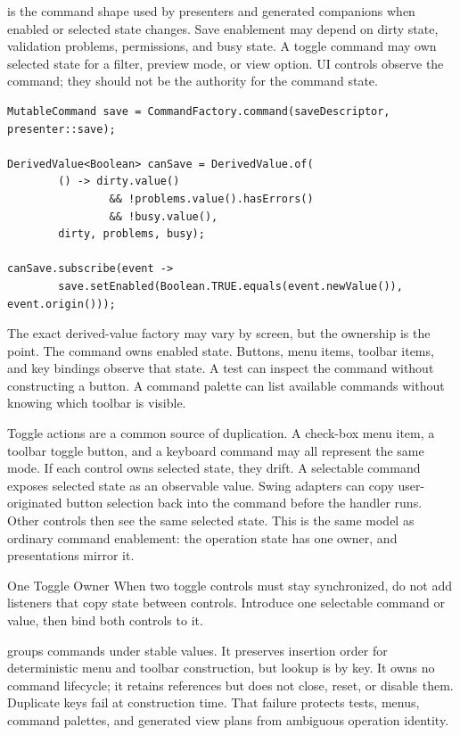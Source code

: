  is the command shape used by presenters and generated
companions when enabled or selected state changes. Save enablement may depend
on dirty state, validation problems, permissions, and busy state. A toggle
command may own selected state for a filter, preview mode, or view option. UI
controls observe the command; they should not be the authority for the command
state.

\begin{lstlisting}[caption={Enablement belongs to the command, not each button.}]
MutableCommand save = CommandFactory.command(saveDescriptor, presenter::save);

DerivedValue<Boolean> canSave = DerivedValue.of(
        () -> dirty.value()
                && !problems.value().hasErrors()
                && !busy.value(),
        dirty, problems, busy);

canSave.subscribe(event ->
        save.setEnabled(Boolean.TRUE.equals(event.newValue()), event.origin()));
\end{lstlisting}

The exact derived-value factory may vary by screen, but the ownership is the
point. The command owns enabled state. Buttons, menu items, toolbar items, and
key bindings observe that state. A test can inspect the command without
constructing a button. A command palette can list available commands without
knowing which toolbar is visible.

Toggle actions are a common source of duplication. A check-box menu item, a
toolbar toggle button, and a keyboard command may all represent the same mode.
If each control owns selected state, they drift. A selectable command exposes
selected state as an observable value. Swing adapters can copy user-originated
button selection back into the command before the handler runs. Other controls
then see the same selected state. This is the same model as ordinary command
enablement: the operation state has one owner, and presentations mirror it.

\begin{migrationbox}{One Toggle Owner}
When two toggle controls must stay synchronized, do not add listeners that copy
state between controls. Introduce one selectable command or value, then bind
both controls to it.
\end{migrationbox}

 groups commands under stable  values. It
preserves insertion order for deterministic menu and toolbar construction, but
lookup is by key. It owns no command lifecycle; it retains references but does
not close, reset, or disable them. Duplicate keys fail at construction time.
That failure protects tests, menus, command palettes, and generated view plans
from ambiguous operation identity.

